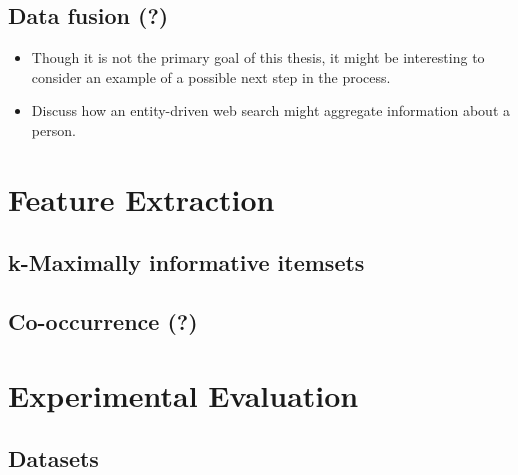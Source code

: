 \documentclass[paper=a4, fontsize=11pt]{scrartcl}
\begin{document}
\subsection{Data fusion (?)}
\begin{itemize}
    \item Though it is not the primary goal of this thesis, it might be interesting to consider an example of a possible next step in the process.
    \item Discuss how an entity-driven web search might aggregate information about a person.
\end{itemize}




\section{Feature Extraction}



\subsection{k-Maximally informative itemsets}

\subsection{Co-occurrence (?)}




\section{Experimental Evaluation}
\label{sec:experiments}

\subsection{Datasets}
\end{document}
